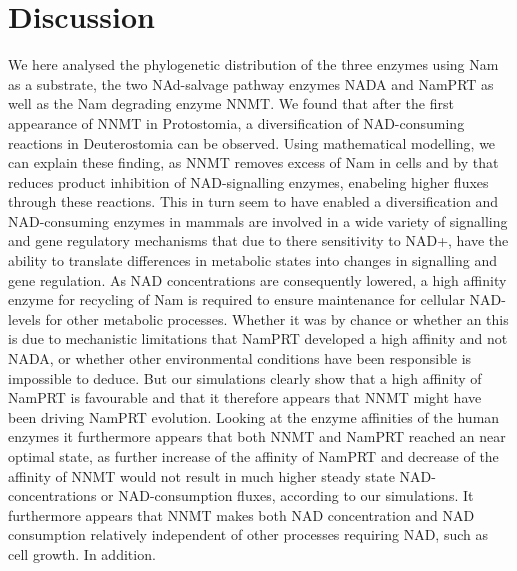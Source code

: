 
\section{Discussion}

We here analysed the phylogenetic distribution of the three enzymes using Nam as a substrate, the two NAd-salvage pathway enzymes NADA and NamPRT as well as the Nam degrading enzyme NNMT. We found that after the first appearance of NNMT in Protostomia, a diversification of NAD-consuming reactions in Deuterostomia can be observed. Using mathematical modelling, we can explain these finding, as NNMT removes excess of Nam in cells and by that reduces product inhibition of NAD-signalling enzymes, enabeling higher fluxes through these reactions. This in turn seem to have enabled a diversification and NAD-consuming enzymes in mammals are involved in a wide variety of signalling and gene regulatory mechanisms that due to there sensitivity to NAD+, have the ability to translate differences in metabolic  states into changes in signalling and gene regulation. As NAD concentrations are consequently lowered, a high affinity enzyme for recycling of Nam is required to ensure maintenance for cellular NAD-levels for other metabolic processes. Whether it was by chance or whether an this is due to mechanistic limitations that NamPRT developed a high affinity and not NADA, or whether other environmental conditions have been responsible is impossible to deduce.  But our simulations clearly show that a high affinity of NamPRT is favourable and that it therefore appears that NNMT might have been driving NamPRT evolution. Looking at the enzyme affinities of the human enzymes it furthermore appears  that both NNMT and NamPRT reached an near optimal state, as further increase of the affinity of NamPRT and decrease of the affinity of NNMT would not result in much higher steady state NAD-concentrations or NAD-consumption fluxes, according to our simulations.  It furthermore appears that NNMT makes both NAD concentration and NAD consumption relatively independent of other processes requiring NAD, such as cell growth. In addition. 

